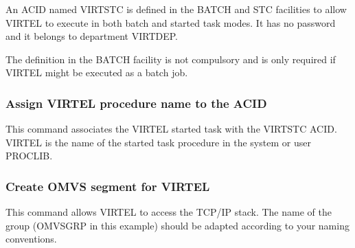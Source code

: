 \documentclass[letterpaper,10pt,english]{sphinxmanual}
\begin{document}

An ACID named VIRTSTC is defined in the BATCH and STC facilities to allow VIRTEL to execute in both batch and started task modes. It has no password and it belongs to department VIRTDEP.

The definition in the BATCH facility is not compulsory and is only required if VIRTEL might be executed as a batch job.


\subsubsection{Assign VIRTEL procedure name to the ACID}
\label{\detokenize{Installation_Guide:assign-virtel-procedure-name-to-the-acid}}
\begin{sphinxVerbatim}[commandchars=\\\{\}]
   
\end{sphinxVerbatim}


This command associates the VIRTEL started task with the VIRTSTC ACID. VIRTEL is the name of the started task procedure in the system or user PROCLIB.


\subsubsection{Create OMVS segment for VIRTEL}
\label{\detokenize{Installation_Guide:id9}}
\begin{sphinxVerbatim}[commandchars=\\\{\}]
     
         
\end{sphinxVerbatim}


This command allows VIRTEL to access the TCP/IP stack. The name of the group (OMVSGRP in this example) should be adapted according to your naming conventions.
\end{document}
